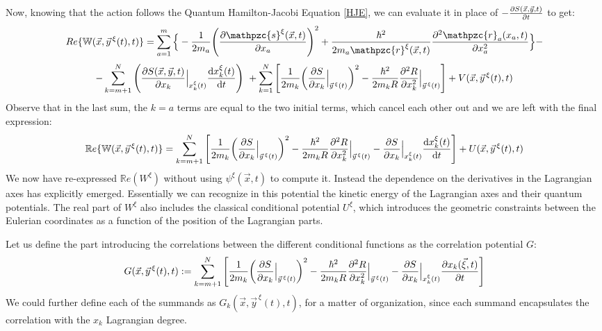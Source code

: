 \documentclass[11pt, a4paper]{article} %
\newcommand{\R}{\mathbb{R}} %
\newcommand{\z}{\mathpzc{s}}
\newcommand{\p}{\mathpzc{r}}
\newcommand{\W}{\mathbb{W}}
\begin{document}
Now, knowing that the action follows the Quantum Hamilton-Jacobi Equation \eqref{HJE}, we can evaluate it in place of $-\pdv{S(\vec{x},\vec{y},t)}{t}$ to get:
\newpage
\begin{equation}
Re\{\W(\vec{x}, \vec{y}^{\, \xi}(t),t)\}=\sum_{a=1}^m\Big\{-\frac{1}{2m_a} \qty(\pdv{\z^\xi(\vec{x},t)}{x_a})^2 +\frac{\hbar^2}{2m_a\p^\xi(\vec{x},t)}\pdv[2]{\p_a(x_a, t)}{x_a}\Big\}-
\end{equation}
$$
-\sum_{k=m+1}^N \qty( \pdv{S(\vec{x},\vec{y},t)}{x_k}\Big\rvert_{x_k^\xi(t)} \dv{x_k^\xi(t)}{t})\ + \sum_{k=1}^N \qty[\frac{1}{2m_k} \qty(\pdv{S}{x_k}\Big\rvert_{\vec{y}^{\, \xi}(t)})^2 -\frac{\hbar^2}{2m_kR}\pdv[2]{R}{x_k}\Big\rvert_{\vec{y}^{\, \xi}(t)} ] + V(\vec{x}, \vec{y}^{\, \xi}(t),t)
$$
Observe that in the last sum, the $k=a$ terms are equal to the two initial terms, which cancel each other out and we are left with the final expression:\vspace{-0.1cm}\label{ReW}
\begin{equation*}
\R e\{\W(\vec{x}, \vec{y}^{\, \xi}(t),t)\}= \sum_{k=m+1}^N \qty[\frac{1}{2m_k} \qty(\pdv{S}{x_k}\Big\rvert_{\vec{y}^{\, \xi}(t)})^2 -\frac{\hbar^2}{2m_kR}\pdv[2]{R}{x_k}\Big\rvert_{\vec{y}^{\, \xi}(t)} -\pdv{S}{x_k}\Big\rvert_{x_k^\xi(t)} \dv{x_k^\xi(t)}{t} ] + U(\vec{x}, \vec{y}^{\, \xi}(t),t)
\end{equation*}
We now have re-expressed $\R e(W^\xi)$ without using $\psi^\xi(\vec{x},t)$ to compute it. Instead the dependence on the derivatives in the Lagrangian axes has explicitly emerged. Essentially we can recognize in this potential the kinetic energy of the Lagrangian axes and their quantum potentials. The real part of $W^\xi$ also includes the classical conditional potential $U^\xi$, which introduces the geometric constraints between the Eulerian coordinates as a function of the position of the Lagrangian parts. 

Let us define the part introducing the correlations between the different conditional functions as the correlation potential $G$:
\begin{equation}\label{G}
G(\vec{x}, \vec{y}^{\, \xi}(t),t):=  \sum_{k=m+1}^N \qty[\frac{1}{2m_k} \qty(\pdv{S}{x_k}\Big\rvert_{\vec{y}^{\, \xi}(t)})^2 -\frac{\hbar^2}{2m_kR}\pdv[2]{R}{x_k}\Big\rvert_{\vec{y}^{\, \xi}(t)} -\pdv{S}{x_k}\Big\rvert_{x_k^\xi(t)} \pdv{x_k(\vec{\xi},t)}{t} ]
\end{equation}
We could further define each of the summands as $G_k(\vec{x},\vec{y}^{\, \xi}(t),t)$, for a matter of organization, since each summand encapsulates the correlation with the $x_k$ Lagrangian degree.
\end{document}

